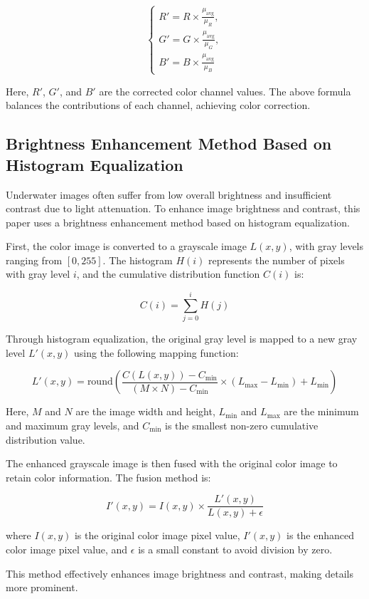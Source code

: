 \documentclass{apmcmthesis}
\begin{document}
\[
\begin{cases} 
R' = R \times \frac{\mu_{\text{avg}}}{\mu_R}, \\
G' = G \times \frac{\mu_{\text{avg}}}{\mu_G}, \\
B' = B \times \frac{\mu_{\text{avg}}}{\mu_B}
\end{cases}
\]

Here, $R'$, $G'$, and $B'$ are the corrected color channel values. The above formula balances the contributions of each channel, achieving color correction.

\subsection{Brightness Enhancement Method Based on Histogram Equalization}
Underwater images often suffer from low overall brightness and insufficient contrast due to light attenuation. To enhance image brightness and contrast, this paper uses a brightness enhancement method based on histogram equalization.

First, the color image is converted to a grayscale image $L(x, y)$, with gray levels ranging from $[0, 255]$. The histogram $H(i)$ represents the number of pixels with gray level $i$, and the cumulative distribution function $C(i)$ is:

\[
C(i) = \sum_{j=0}^{i} H(j)
\]

Through histogram equalization, the original gray level is mapped to a new gray level $L'(x, y)$ using the following mapping function:

\[
L'(x, y) = \text{round} \left( \frac{C(L(x, y)) - C_{\text{min}}}{(M \times N) - C_{\text{min}}} \times (L_{\text{max}} - L_{\text{min}}) + L_{\text{min}} \right)
\]

Here, $M$ and $N$ are the image width and height, $L_{\text{min}}$ and $L_{\text{max}}$ are the minimum and maximum gray levels, and $C_{\text{min}}$ is the smallest non-zero cumulative distribution value.

The enhanced grayscale image is then fused with the original color image to retain color information. The fusion method is:

\[
I'(x, y) = I(x, y) \times \frac{L'(x, y)}{L(x, y) + \epsilon}
\]

where $I(x, y)$ is the original color image pixel value, $I'(x, y)$ is the enhanced color image pixel value, and $\epsilon$ is a small constant to avoid division by zero.

This method effectively enhances image brightness and contrast, making details more prominent.
\end{document}

